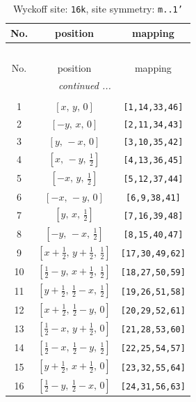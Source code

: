 \documentclass[fleqn,8pt]{jsarticle}
\begin{document}
\renewcommand{\arraystretch}{1.2}
\begin{longtable}{ccc}
\caption{Wyckoff site: {\tt 16k}, site symmetry: {\tt m..1'}}
 \\
 \hline \hline
No. & position & mapping \\ \hline \endfirsthead

\multicolumn{2}{l}{\tablename\ \thetable{}} \\
 \hline \hline
No. & position & mapping \\ \hline \endhead

 \hline \hline
\multicolumn{2}{r}{\footnotesize\it continued ...} \\ \endfoot

 \hline \hline
\multicolumn{2}{r}{} \\ \endlastfoot

1 & $\left[ x,\, y,\, 0 \right]$ & {\tt [1,14,33,46]} \\ \hline
2 & $\left[ - y,\, x,\, 0 \right]$ & {\tt [2,11,34,43]} \\ \hline
3 & $\left[ y,\, - x,\, 0 \right]$ & {\tt [3,10,35,42]} \\ \hline
4 & $\left[ x,\, - y,\, \frac{1}{2} \right]$ & {\tt [4,13,36,45]} \\ \hline
5 & $\left[ - x,\, y,\, \frac{1}{2} \right]$ & {\tt [5,12,37,44]} \\ \hline
6 & $\left[ - x,\, - y,\, 0 \right]$ & {\tt [6,9,38,41]} \\ \hline
7 & $\left[ y,\, x,\, \frac{1}{2} \right]$ & {\tt [7,16,39,48]} \\ \hline
8 & $\left[ - y,\, - x,\, \frac{1}{2} \right]$ & {\tt [8,15,40,47]} \\ \hline
9 & $\left[ x + \frac{1}{2},\, y + \frac{1}{2},\, \frac{1}{2} \right]$ & {\tt [17,30,49,62]} \\ \hline
10 & $\left[ \frac{1}{2} - y,\, x + \frac{1}{2},\, \frac{1}{2} \right]$ & {\tt [18,27,50,59]} \\ \hline
11 & $\left[ y + \frac{1}{2},\, \frac{1}{2} - x,\, \frac{1}{2} \right]$ & {\tt [19,26,51,58]} \\ \hline
12 & $\left[ x + \frac{1}{2},\, \frac{1}{2} - y,\, 0 \right]$ & {\tt [20,29,52,61]} \\ \hline
13 & $\left[ \frac{1}{2} - x,\, y + \frac{1}{2},\, 0 \right]$ & {\tt [21,28,53,60]} \\ \hline
14 & $\left[ \frac{1}{2} - x,\, \frac{1}{2} - y,\, \frac{1}{2} \right]$ & {\tt [22,25,54,57]} \\ \hline
15 & $\left[ y + \frac{1}{2},\, x + \frac{1}{2},\, 0 \right]$ & {\tt [23,32,55,64]} \\ \hline
16 & $\left[ \frac{1}{2} - y,\, \frac{1}{2} - x,\, 0 \right]$ & {\tt [24,31,56,63]} \\
\end{longtable}
\end{document}
